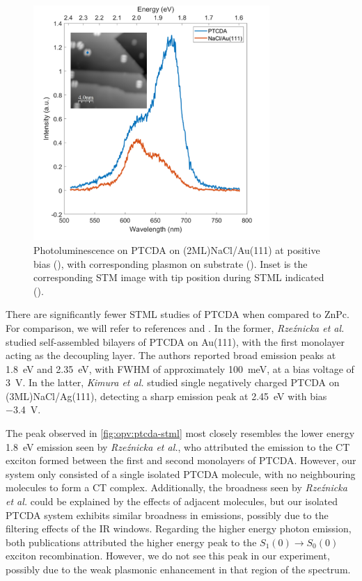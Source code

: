 \begin{figure} [H]
    \centering
        \includegraphics[width=0.8\textwidth]{pictures/ptcda_+ve_emission_inset.png}
    \caption{Photoluminescence on PTCDA on (2ML)NaCl/Au(111) at positive bias (), with corresponding plasmon on substrate (). Inset is the corresponding STM image with tip position during STML indicated (). }
    \label{fig:opv:ptcda-stml}
\end{figure}

There are significantly fewer \ac{STML} studies of PTCDA when compared to ZnPc. For comparison, we will refer to references \citep{Rzeznicka2011} and \citep{Kimura2019}. In the former, \textit{Rze\'znicka et al.} studied self-assembled bilayers of PTCDA on Au(111), with the first monolayer acting as the decoupling layer. The authors reported broad emission peaks at \SI{1.8}{eV} and \SI{2.35}{eV}, with FWHM of approximately \SI{100}{meV}, at a bias voltage of \SI{3}{V}. In the latter, \textit{Kimura et al.} studied single negatively charged PTCDA on (3ML)NaCl/Ag(111), detecting a sharp emission peak at \SI{2.45}{eV} with bias \SI{-3.4}{V}. 

The peak observed in \autoref{fig:opv:ptcda-stml} most closely resembles the lower energy \SI{1.8}{eV} emission seen by \textit{Rze\'znicka et al.}, who attributed the emission to the \ac{CT} exciton formed between the first and second monolayers of PTCDA. However, our system only consisted of a single isolated PTCDA molecule, with no neighbouring molecules to form a \ac{CT} complex. Additionally, the broadness seen by \textit{Rze\'znicka et al.} could be explained by the effects of adjacent molecules, but our isolated PTCDA system exhibits similar broadness in emissions, possibly due to the filtering effects of the IR windows. Regarding the higher energy photon emission, both publications attributed the higher energy peak to the $S_1(0) \rightarrow S_0(0)$ exciton recombination. However, we do not see this peak in our experiment, possibly due to the weak plasmonic enhancement in that region of the spectrum.

